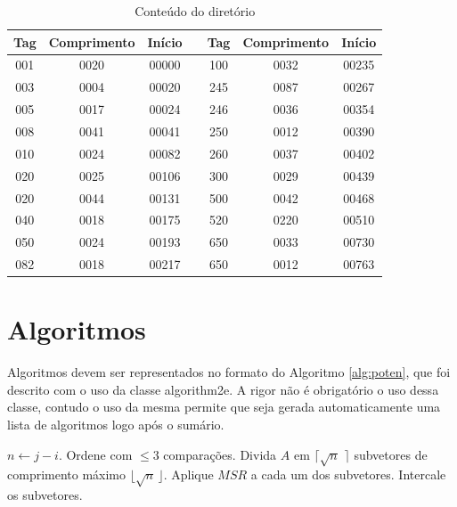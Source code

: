 \begin{table}[hp]
\centering
\caption{Conteúdo do diretório \cite{Mar2004} }
\label{tab:MarcMNem} 
\begin{tabular}{|c|c|c|c|c|c|c|}
\hline Tag & Comprimento & Início &   & Tag & Comprimento & Início \\ 
\hline 001 & 0020 & 00000 && 100 & 0032 & 00235\\ 
\hline 003 & 0004 & 00020 && 245 & 0087 & 00267\\ 
\hline 005 & 0017 & 00024 && 246 & 0036 & 00354\\ 
\hline 008 & 0041 & 00041 && 250 & 0012 & 00390\\ 
\hline 010 & 0024 & 00082 && 260 & 0037 & 00402\\ 
\hline 020 & 0025 & 00106 && 300 & 0029 & 00439\\ 
\hline 020 & 0044 & 00131 && 500 & 0042 & 00468\\ 
\hline 040 & 0018 & 00175 && 520 & 0220 & 00510\\ 
\hline 050 & 0024 & 00193 && 650 & 0033 & 00730\\ 
\hline 082 & 0018 & 00217 && 650 & 0012 & 00763\\ 
\hline 
\end{tabular} 
\end{table}

\section{Algoritmos}
\label{sec:algor} 
Algoritmos devem ser representados no formato do Algoritmo \ref{alg:poten}, que foi descrito com o uso da classe \textsf{algorithm2e}. A rigor não é obrigatório o uso dessa classe, contudo o uso da mesma permite que seja gerada automaticamente uma lista de algoritmos logo após o sumário.

\medskip
\begin{center}
\begin{minipage}{0.92\textwidth}
\begin{algorithm2e}[H]
 \DontPrintSemicolon
 \LinesNumbered
 \SetAlgoLined
 \BlankLine
 \BlankLine
 $n \leftarrow j - i$.\;
   {Ordene com $\leq 3$ comparações.}
   {Divida $A$ em $\lceil\sqrt{n}\,\,\rceil$ subvetores de comprimento máximo $\lfloor\sqrt{n}\,\rfloor$.\;
    Aplique $MSR$ a cada um dos subvetores.\;
    Intercale os subvetores.\;}
\caption{$MSR(A,i,j)$ \label {alg:poten}}
\end{algorithm2e}
\end{minipage}
\end{center}

